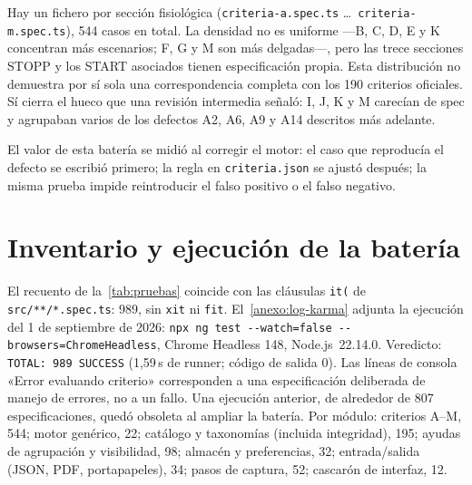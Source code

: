 Hay un fichero por sección fisiológica (\texttt{criteria-a.spec.ts} \ldots\
\texttt{criteria-m.spec.ts}), 544 casos en total. La densidad no es
uniforme ---B, C, D, E y K concentran más escenarios; F, G y M son más
delgadas---, pero las trece secciones STOPP y los START asociados tienen
especificación propia. Esta distribución no demuestra por sí sola una
correspondencia completa con los 190 criterios oficiales. Sí cierra el hueco
que una revisión intermedia
señaló: I, J, K y M carecían de spec y agrupaban varios de los defectos
A2, A6, A9 y A14 descritos más adelante.

El valor de esta batería se midió al corregir el motor: el caso que
reproducía el defecto se escribió primero; la regla en
\texttt{criteria.json} se ajustó después; la misma prueba impide
reintroducir el falso positivo o el falso negativo.

\section{Inventario y ejecución de la batería}

El recuento de la~\cref{tab:pruebas} coincide con las cláusulas
\texttt{it(} de \texttt{src/**/*.spec.ts}: 989, sin \texttt{xit} ni
\texttt{fit}. El~\cref{anexo:log-karma} adjunta la ejecución del
1 de septiembre de 2026: \texttt{npx ng test -{}-watch=false
-{}-browsers=ChromeHeadless}, Chrome Headless 148, Node.js~22.14.0.
Veredicto: \texttt{TOTAL: 989 SUCCESS} (1,59\,s de runner; código de
salida 0). Las líneas de consola «Error evaluando criterio» corresponden
a una especificación deliberada de manejo de errores, no a un fallo.
Una ejecución anterior, de alrededor de 807 especificaciones, quedó
obsoleta al ampliar la batería. Por módulo: criterios A--M, 544; motor
genérico, 22; catálogo y taxonomías (incluida integridad), 195; ayudas
de agrupación y visibilidad, 98; almacén y preferencias, 32;
entrada/salida (JSON, PDF, portapapeles), 34; pasos de captura, 52;
cascarón de interfaz, 12.

